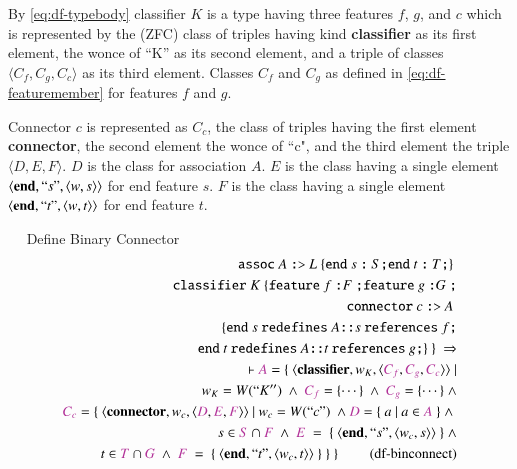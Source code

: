 \pn By \ref{eq:df-typebody} classifier $K$ is a type having three features $f$, $g$, and $c$ which is represented by the (ZFC) class of triples having kind \textbf{classifier} as its first element, the wonce of ``K'' as its second element, and a triple of classes $\langle C_f,C_g,C_c\rangle$ as its third element.  Classes $C_f$ and $C_g$ as defined in \ref{eq:df-featuremember} for features $f$ and $g$.

\pn Connector $c$ is represented as $C_c$, the class of triples having the first element \textbf{connector}, the second element the wonce of ``c", and the third element the triple $\langle D,E,F\rangle$.
$D$ is the class for association $A$.  $E$ is the class having a single element $\langle\textbf{end},``s",\langle w,s \rangle\rangle$ for end feature $s$.
 $F$ is the class having a single element $\langle\textbf{end},``t",\langle w,t \rangle\rangle$ for end feature $t$.

\begin{definition}~~   Define Binary Connector
\begin{align}
\texttt{assoc}~ A~\texttt{:>}~L~\{ \texttt{end}~ s ~\texttt{:}~ S\texttt{;} \texttt{end}~ t ~\texttt{:}~ T\texttt{;} \}~  \notag \\
\texttt{classifier}~K~\{ %
\texttt{feature}~f~\texttt{:} F~\texttt{;} %
\texttt{feature}~g~\texttt{:} G~\texttt{;} \notag \\
\texttt{connector}~ c~\texttt{:>}~A~\notag \\
~~~~\{ \texttt{end}~ s ~\texttt{redefines}~A\texttt{::}s~\texttt{references}~f \texttt{;}\notag \\
~~~~ \texttt{end}~ t ~\texttt{redefines}~A\texttt{::}t~\texttt{references}~g\texttt{;} \}~%
\}~\Rightarrow  \notag \\
\vdash \mc{A} = \{~\langle \textbf{classifier},w_K,\langle \mc{C_f},\mc{C_g},\mc{C_c}\rangle\rangle~\vert \notag \\
w_K=W(``K'')~ \wedge~\mc{C_f}=\{\cdots\}~\wedge~\mc{C_g}=\{\cdots\}~\wedge \notag \\
\mc{C_c}=\{~\langle \textbf{connector},w_c,\langle \mc{D},\mc{E},\mc{F}\rangle\rangle ~\vert~
w_c=W(``c")~ \wedge 
\mc{D}=\{~a~\vert ~a \in \mc{A}~\}~\wedge~\notag \\
~s\in \mc{S}\cap \mc{F}~\wedge~\mc{E}~=~\{~\langle\textbf{end},``s",\langle w_c,s \rangle\rangle~\}~\wedge \notag \\
~t\in \mc{T}\cap \mc{G}~\wedge~\mc{F}~=~\{~\langle\textbf{end},``t",\langle w_c,t \rangle\rangle~\}~\}~\}~\label{eq:df-binconnect}\tag{df-binconnect}
\end{align}
\end{definition}

